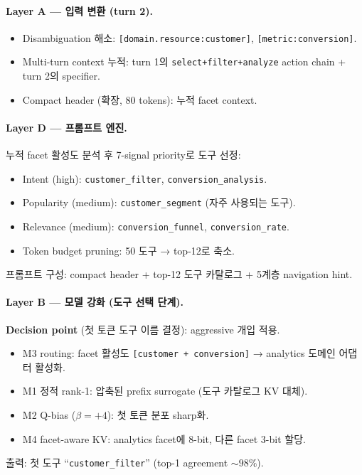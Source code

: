 \paragraph{Layer A — 입력 변환 (turn 2).}
\begin{itemize}[leftmargin=*]
\item Disambiguation 해소: \texttt{[domain.resource:customer]}, \texttt{[metric:conversion]}.
\item Multi-turn context 누적: turn 1의 \texttt{select+filter+analyze} action chain + turn 2의 specifier.
\item Compact header (확장, 80 tokens): 누적 facet context.
\end{itemize}

\paragraph{Layer D — 프롬프트 엔진.}
누적 facet 활성도 분석 후 7-signal priority로 도구 선정:
\begin{itemize}[leftmargin=*]
\item Intent (high): \texttt{customer\_filter}, \texttt{conversion\_analysis}.
\item Popularity (medium): \texttt{customer\_segment} (자주 사용되는 도구).
\item Relevance (medium): \texttt{conversion\_funnel}, \texttt{conversion\_rate}.
\item Token budget pruning: 50 도구 → top-12로 축소.
\end{itemize}
프롬프트 구성: compact header + top-12 도구 카탈로그 + 5계층 navigation hint.

\paragraph{Layer B — 모델 강화 (도구 선택 단계).}
\textbf{Decision point} (첫 토큰 도구 이름 결정): aggressive 개입 적용.
\begin{itemize}[leftmargin=*]
\item M3 routing: facet 활성도 \texttt{[customer + conversion]} → analytics 도메인 어댑터 활성화.
\item M1 정적 rank-1: 압축된 prefix surrogate (도구 카탈로그 KV 대체).
\item M2 Q-bias ($\beta = +4$): 첫 토큰 분포 sharp화.
\item M4 facet-aware KV: analytics facet에 8-bit, 다른 facet 3-bit 할당.
\end{itemize}
출력: 첫 도구 ``\texttt{customer\_filter}'' (top-1 agreement $\sim 98\%$).

